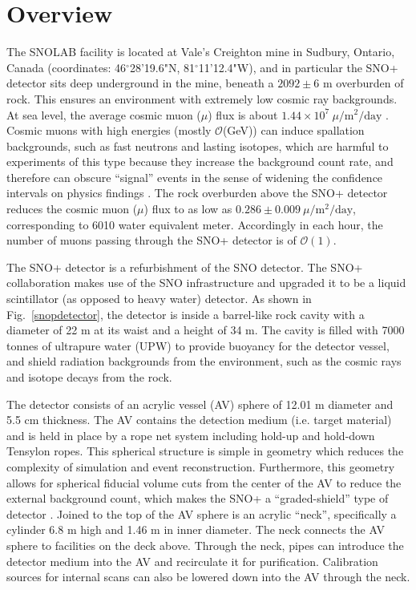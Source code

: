 
\section{Overview}\label{sect:overview}

The SNOLAB facility is located at Vale's Creighton mine in Sudbury, Ontario, Canada (coordinates: 46$^\circ$28'19.6"N, 81$^\circ$11'12.4"W), and in particular the SNO+ detector sits deep underground in the mine, beneath a $2092\pm6$ m overburden of rock\cite{snolabuserhandbook,snop_jinst}. This ensures an environment with extremely low cosmic ray backgrounds. At sea level, the average cosmic muon ($\mu$) flux is about $1.44\times 10^7~\mu/\mathrm{m^2/day}$ \cite{muonflux}. Cosmic muons with high energies (mostly $\mathcal{O}$(GeV)) can induce spallation backgrounds, such as fast neutrons and lasting isotopes, which are harmful to experiments of this type because they increase the background count rate, and therefore can obscure ``signal'' events in the sense of widening the confidence intervals on physics findings \cite{beacom2017physics}. The rock overburden above the SNO+ detector reduces the cosmic muon ($\mu$) flux to as low as $0.286\pm0.009~\mu/\mathrm{m^2/day}$, corresponding to 6010 water equivalent meter\cite{snop_jinst}. Accordingly in each hour, the number of muons passing through the SNO+ detector is of $\mathcal{O}(1)$.

The SNO+ detector is a refurbishment of the SNO detector. The SNO+ collaboration makes use of the SNO infrastructure and upgraded it to be a liquid scintillator (as opposed to heavy water) detector. As shown in Fig.~\ref{snopdetector}, the detector is inside a barrel-like rock cavity with a diameter of 22 m at its waist and a height of 34 m. The cavity is filled with 7000 tonnes of ultrapure water (UPW) to provide buoyancy for the detector vessel, and shield radiation backgrounds from the environment, such as the cosmic rays and isotope decays from the rock. 

The detector consists of an acrylic vessel (AV) sphere of 12.01 m diameter and 5.5 cm thickness. The AV contains the detection medium (i.e. target material) and is held in place by a rope net system including hold-up and hold-down Tensylon ropes. This spherical structure is simple in geometry which reduces the complexity of simulation and event reconstruction. Furthermore, this geometry allows for spherical fiducial volume cuts from the center of the AV to reduce the external background count, which makes the SNO+ a ``graded-shield'' type of detector \cite{waterfield2017optical}.
Joined to the top of the AV sphere is an acrylic ``neck'', specifically a cylinder 6.8 m high and 1.46 m in inner diameter. The neck connects the AV sphere to facilities on the deck above. Through the neck, pipes can introduce the detector medium into the AV and recirculate it for purification. Calibration sources for internal scans can also be lowered down into the AV through the neck.

